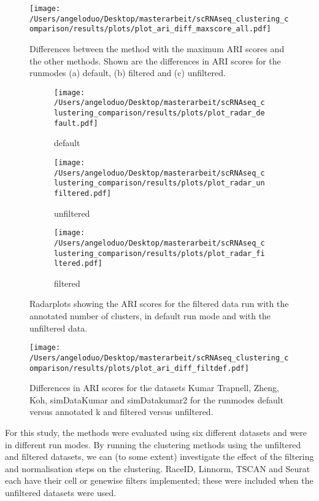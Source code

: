 \documentclass[12pt, a4paper]{article}\usepackage[]{graphicx}\usepackage[]{color}
\begin{document}
\begin{figure}[!h]
\centering
\texttt{[image: /Users/angeloduo/Desktop/masterarbeit/scRNAseq\_clustering\_comparison/results/plots/plot\_ari\_diff\_maxscore\_all.pdf]}
\caption{Differences between the method with the maximum ARI scores and the other methods. Shown are the differences in ARI scores for the runmodes (a) default, (b) filtered and (c) unfiltered.  }
\label{fig:aridiff1}
\end{figure}

\begin{figure}
\centering
\begin{subfigure}{.5\textwidth}
  \centering
  \texttt{[image: /Users/angeloduo/Desktop/masterarbeit/scRNAseq\_clustering\_comparison/results/plots/plot\_radar\_default.pdf]}
  \caption{default}
  \label{fig:radd}
\end{subfigure}%
\begin{subfigure}{.5\textwidth}
  \centering
  \texttt{[image: /Users/angeloduo/Desktop/masterarbeit/scRNAseq\_clustering\_comparison/results/plots/plot\_radar\_unfiltered.pdf]}
  \caption{unfiltered}
  \label{fig:radu}
\end{subfigure}
\begin{subfigure}{.5\textwidth}
  \centering
  \texttt{[image: /Users/angeloduo/Desktop/masterarbeit/scRNAseq\_clustering\_comparison/results/plots/plot\_radar\_filtered.pdf]}
  \caption{filtered}
  \label{fig:radf}
\end{subfigure}%
\caption{Radarplots showing the ARI scores for the filtered data run with the annotated number of clusters, in default run mode and with the unfiltered data. }
\label{fig:radar}
\end{figure}

\begin{figure}[htp]
\begin{center}
\texttt{[image: /Users/angeloduo/Desktop/masterarbeit/scRNAseq\_clustering\_comparison/results/plots/plot\_ari\_diff\_filtdef.pdf]}
\caption{Differences in ARI scores for the datasets Kumar Trapnell, Zheng, Koh, simDataKumar and simDatakumar2 for the runmodes default versus annotated k and filtered versus unfiltered.}
\label{fig:diff}
\end{center}
\end{figure}

For this study, the methods were evaluated using six different datasets and were in different run modes. By running the clustering methods using the unfiltered and filtered datasets, we can (to some extent) investigate the effect of the filtering and normalisation steps on the clustering. RaceID, Linnorm, TSCAN and Seurat each have their cell or genewise filters implemented; these were included when the unfiltered datasets were used. 
\end{document}

